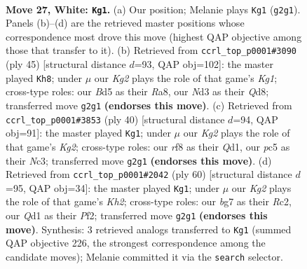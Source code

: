 \documentclass[11pt]{article}
\begin{document}
\clearpage

\begin{figure}[p]\centering
\begin{subfigure}{0.46\textwidth}\centering
\resizebox{\linewidth}{!}{%
\newchessgame
\chessboard[
  setfen={3rqr1k/6b1/1pn5/p1pBPpn1/2P2R2/1P1N3p/PB1P2K1/1R1Q4 w - - 0 27},
  showmover=false,
  pgfstyle=straightmove, color=movearrow, markmove={g2-g1}
]}
\caption{}
\end{subfigure}\hfill
\begin{subfigure}{0.46\textwidth}\centering
\resizebox{\linewidth}{!}{%
\newchessgame
\chessboard[
  setfen={r2q2k1/2p1bPpp/2n3b1/rp6/5BP1/2Pp1N1P/BP3P2/R2QR1K1 b - - 0 23},
  showmover=false,
  pgfstyle=straightmove, color=movearrow, markmove={g8-h8}
]}
\caption{}
\end{subfigure}
\\[4pt]
\begin{subfigure}{0.46\textwidth}\centering
\resizebox{\linewidth}{!}{%
\newchessgame
\chessboard[
  setfen={1r4rk/p1pqpp1p/1n5b/4P3/2pBB3/2N3Pb/PP3PK1/R2QR3 w - - 3 21},
  showmover=false,
  pgfstyle=straightmove, color=movearrow, markmove={g2-g1}
]}
\caption{}
\end{subfigure}\hfill
\begin{subfigure}{0.46\textwidth}\centering
\resizebox{\linewidth}{!}{%
\newchessgame
\chessboard[
  setfen={1r1q2k1/2rb1pp1/R1n4p/3p4/1p1Pn3/1Q1BPNP1/2R2PPK/4B3 w - - 2 31},
  showmover=false,
  pgfstyle=straightmove, color=movearrow, markmove={h2-g1}
]}
\caption{}
\end{subfigure}
\caption{\textbf{Move 27, White: \texttt{Kg1}.} (a) Our position; Melanie plays \texttt{Kg1} (\texttt{g2g1}). Panels (b)--(d) are the retrieved master positions whose correspondence most drove this move (highest QAP objective among those that transfer to it). (b) Retrieved from \texttt{ccrl\_top\_p0001\#3090} (ply 45) [structural distance $d$=93, QAP obj=102]: the master played \texttt{Kh8}; under $\mu$ our \emph{Kg2} plays the role of that game's \emph{Kg1}; cross-type roles: our \emph{B}d5 as their \emph{R}a8, our \emph{N}d3 as their \emph{Q}d8; transferred move \texttt{g2g1} \textbf{(endorses this move)}. (c) Retrieved from \texttt{ccrl\_top\_p0001\#3853} (ply 40) [structural distance $d$=94, QAP obj=91]: the master played \texttt{Kg1}; under $\mu$ our \emph{Kg2} plays the role of that game's \emph{Kg2}; cross-type roles: our \emph{r}f8 as their \emph{Q}d1, our \emph{p}c5 as their \emph{N}c3; transferred move \texttt{g2g1} \textbf{(endorses this move)}. (d) Retrieved from \texttt{ccrl\_top\_p0001\#2042} (ply 60) [structural distance $d$=95, QAP obj=34]: the master played \texttt{Kg1}; under $\mu$ our \emph{Kg2} plays the role of that game's \emph{Kh2}; cross-type roles: our \emph{b}g7 as their \emph{R}c2, our \emph{Q}d1 as their \emph{P}f2; transferred move \texttt{g2g1} \textbf{(endorses this move)}. Synthesis: 3 retrieved analogs transferred to \texttt{Kg1} (summed QAP objective 226, the strongest correspondence among the candidate moves); Melanie committed it via the \texttt{search} selector.}
\label{fig:thought-m52}
\end{figure}
\end{document}
